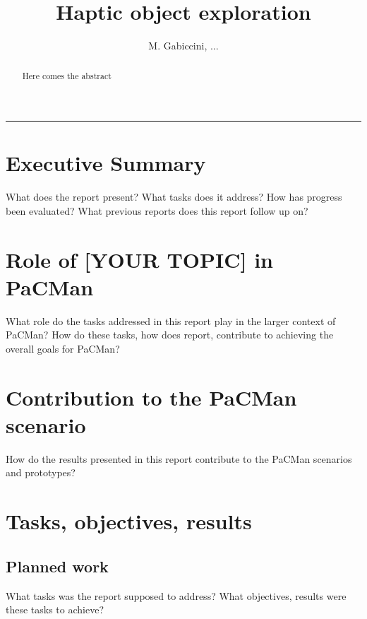 \documentclass[a4paper,11pt,pdf]{pacmanreport}
\title{Haptic object exploration}
\author{M. Gabiccini, ...}
\begin{document}
\maketitle

\begin{abstract}
\noindent Here comes the abstract
\end{abstract}


\vspace{.2em}
\hrule

\footnotesize

\tableofcontents

\normalsize

\newpage

\section*{Executive Summary}

What does the report present? What tasks does it address? How has progress been evaluated? What previous reports does this report follow up on? 

\section*{Role of [YOUR TOPIC] in PaCMan}

What role do the tasks addressed in this report play in the larger context of PaCMan? How do these tasks, how does report, contribute to achieving the overall goals for PaCMan? 

\section*{Contribution to the PaCMan scenario}

How do the results presented in this report contribute to the PaCMan\cite{ProjectWebsite} scenarios and prototypes? 


\newpage

\section{Tasks, objectives, results}

\subsection{Planned work}

What tasks was the report supposed to address? What objectives, results were these tasks to achieve? 
\end{document}
